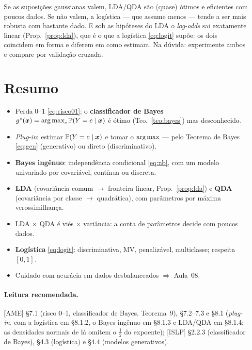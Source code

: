 \documentclass[11pt,a4paper]{article}
\begin{document}
\begin{ideia}
Se as suposições gaussianas valem, LDA/QDA são (quase) ótimos e eficientes com
poucos dados. Se não valem, a logística --- que assume menos --- tende a ser mais
robusta com bastante dado. E sob as hipóteses do LDA o \emph{log-odds} sai
exatamente linear (Prop.~\ref{prop:lda}), que é o que a logística
\eqref{eq:logit} supõe: os dois coincidem em forma e diferem em como estimam. Na
dúvida: experimente ambos e compare por validação cruzada.
\end{ideia}

\section*{Resumo}
\begin{itemize}[leftmargin=1.4cm]
  \item Perda 0--1 \eqref{eq:risco01}; o \textbf{classificador de Bayes}
        $g^*(\x)=\argmax_c\Prob(Y=c\mid\x)$ é ótimo (Teo.~\ref{teo:bayes}) mas
        desconhecido.
  \item \emph{Plug-in}: estimar $\mathbb{P}(Y=c\mid\bm{x})$ e tomar o $\argmax$ --- pelo
        Teorema de Bayes \eqref{eq:gen} (generativo) ou direto (discriminativo).
  \item \textbf{Bayes ingênuo}: independência condicional \eqref{eq:nb}, com um
        modelo univariado por covariável, contínua ou discreta.
  \item \textbf{LDA} (covariância comum $\to$ fronteira linear,
        Prop.~\ref{prop:lda}) e \textbf{QDA} (covariância por classe $\to$
        quadrática), com parâmetros por máxima verossimilhança.
  \item LDA $\times$ QDA é viés $\times$ variância: a conta de parâmetros decide
        com poucos dados.
  \item \textbf{Logística} \eqref{eq:logit}: discriminativa, MV, penalizável,
        multiclasse; respeita $[0,1]$.
  \item Cuidado com acurácia em dados desbalanceados $\Rightarrow$ Aula~08.
\end{itemize}

\paragraph{Leitura recomendada.} [AME] §7.1 (risco 0--1, classificador de Bayes,
Teorema~9), §7.2--7.3 e §8.1 (\emph{plug-in}, com a logística em §8.1.2, o Bayes
ingênuo em §8.1.3 e LDA/QDA em §8.1.4; as densidades normais de lá omitem o
$\tfrac12$ do expoente); [ISLP] §2.2.3 (classificador de Bayes), §4.3 (logística) e
§4.4 (modelos generativos).
\end{document}
